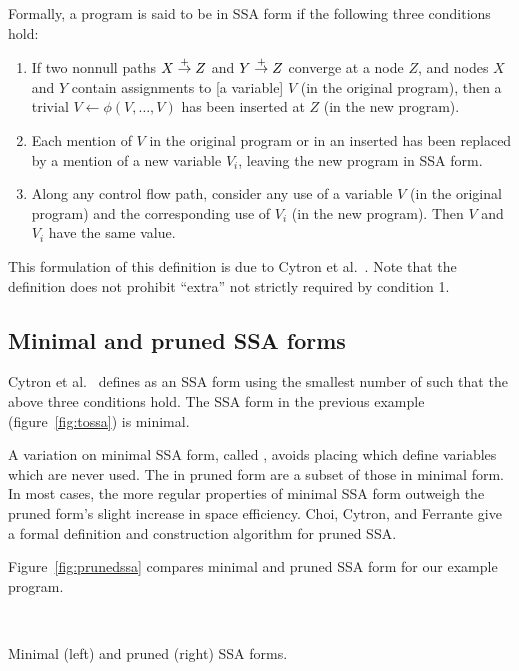 \documentclass[12pt,titlepage,twoside]{article}
\begin{document}
Formally, a program is said to be in SSA form if the following three
conditions hold:
\begin{enumerate}
\item If two nonnull paths $X \stackrel{+}{\rightarrow} Z$ and $Y \stackrel{+}{\rightarrow} Z$
converge at a node $Z$, and nodes $X$ and $Y$ contain assignments to
[a variable] $V$ (in the original program), then a trivial
\phifunction{} $V \leftarrow \phi(V, \ldots, V)$ has been inserted at
$Z$ (in the new program). \label{criteria1}
\item Each mention of $V$ in the original program or in an inserted
\phifunction{} has been replaced by a mention of a new variable $V_i$,
leaving the new program in SSA form.
\item Along any control flow path, consider any use of a variable $V$
(in the original program) and the corresponding use of $V_i$ (in the
new program).  Then $V$ and $V_i$ have the same value.
\end{enumerate}
This formulation of this definition is due to Cytron et al.\ 
\cite{cytron91:ssa}.  Note that the definition does not prohibit
``extra'' \phifunction{s} not strictly required by condition 1.

\subsection{Minimal and pruned SSA forms}
Cytron et al.\ \cite{cytron91:ssa} defines  as
an SSA form using the smallest number of \phifunction{s} such that the
above three conditions hold.  
The SSA form in the previous example (figure~\vref{fig:tossa}) is minimal.

A variation
on minimal SSA form, called ,
avoids placing  which define variables which are never used.
The \phifunction{s} in pruned form are a subset of those in minimal form.
In most cases, the more regular properties of minimal SSA form
outweigh the pruned form's slight increase in space efficiency.
Choi, Cytron, and Ferrante \cite{ferrante91:pruned} give a formal
definition and construction algorithm for pruned SSA.

Figure~\vref{fig:prunedssa} compares minimal and pruned SSA form for
our example program.
\begin{myfigure}
\begin{center}
 \vline\ 
\end{center}
\caption[Minimal and pruned SSA forms.]
{Minimal (left) and pruned (right) SSA forms.}
\label{fig:prunedssa}
\end{myfigure}
\end{document}
